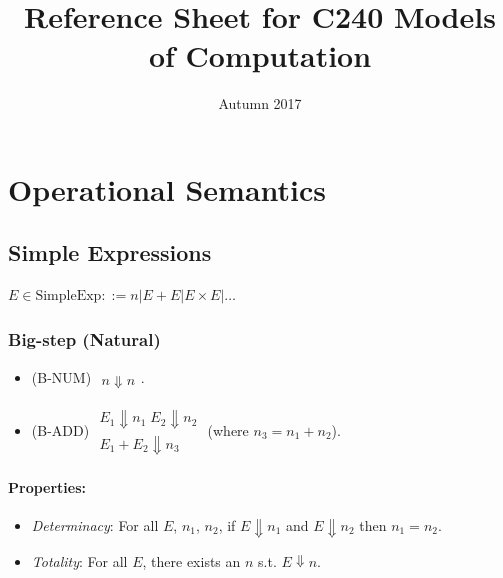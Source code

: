\documentclass[twocolumn,english]{article}
\begin{document}
\title{Reference Sheet for C240 Models of Computation}

\date{Autumn 2017}
\maketitle

\section{Operational Semantics}

\subsection{Simple Expressions}

$E\in\text{SimpleExp}::=n\lvert E+E\lvert E\times E\lvert\dots$

\subsubsection{Big-step (Natural)}
\begin{itemize}
\item {\scriptsize{}(B-NUM)} $\begin{array}{c}
\\
\hline n\Downarrow n
\end{array}$.
\item {\scriptsize{}(B-ADD)} $\begin{array}{c}
E_{1}\Downarrow n_{1}\;E_{2}\Downarrow n_{2}\\
\hline E_{1}+E_{2}\Downarrow n_{3}
\end{array}$ (where $n_{3}=n_{1}+n_{2}$).
\end{itemize}

\paragraph{Properties:}
\begin{itemize}
\item \emph{Determinacy}: For all $E$, $n_{1}$, $n_{2}$, if $E\Downarrow n_{1}$
and $E\Downarrow n_{2}$ then $n_{1}=n_{2}$.
\item \emph{Totality}: For all $E$, there exists an $n$ s.t. $E\Downarrow n$.
\end{itemize}
\end{document}
